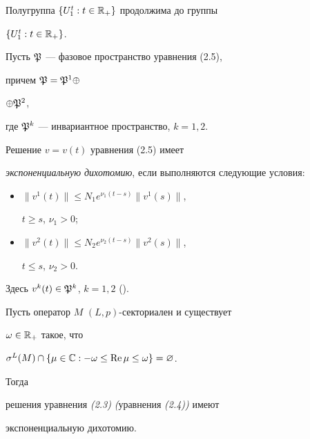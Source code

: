  


\begin{notem} Полугруппа $\{U^t_1:t\in\Bbb R_+\}$ продолжима до группы 


$\{U^t_1:t\in\Bbb R_+\}$. 


\end{notem} 


 


\begin{defnm} Пусть $\frak P$ --- фазовое пространство уравнения (2.5),


причем $\frak P=\frak P^1\oplus$




$\oplus\frak P^2$, 


где $\frak P^k$ --- инвариантное пространство, $k=1,2$.


Решение $v=v(t)$ уравнения (2.5) имеет 


{\em экспоненциальную дихотомию}, если выполняются следующие условия: 


\begin{itemize} 


\item[(i)] $\|v^1(t)\|\le N_1 e^{\nu_1(t-s)}\|v^1(s)\|$, 


$t\ge s$, $\nu_1>0$; 


\item[(ii)]$\|v^2(t)\|\le N_2 e^{\nu_2(t-s)}\|v^2(s)\|$,


$t\le s$, $\nu_2>0$.


\end{itemize} 


Здесь $v^k(t)\in\frak P^k$, $k=1,2$ (\cite{Dal}). 


\end{defnm} 


 


\begin{thmm} Пусть оператор $M$ $(L,p)$-секториален и существует 


$\omega\in\Bbb R_+$ такое, что 


$\sigma^L(M)\cap\{\mu\in\Bbb C:-\omega\le\Re \mu\le \omega\}=\varnothing$. 


Тогда 


решения уравнения {\em (2.3)} {\em (}уравнения {\em (2.4))} имеют 


экспоненциальную дихотомию. 


\end{thmm} 


